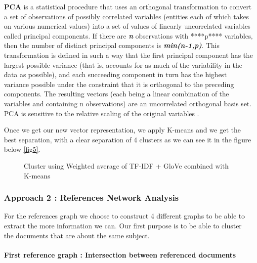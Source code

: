 \documentclass[journal,twocolumn]{IEEEtran}
\begin{document}
\textbf{PCA} is a statistical procedure that uses an orthogonal
transformation to convert a set of observations of possibly correlated
variables (entities each of which takes on various numerical values)
into a set of values of linearly uncorrelated variables called principal
components. If there are \textbf{\emph{n}} observations with ****p****
variables, then the number of distinct principal components is
\textbf{\emph{min(n-1,p)}}. This transformation is defined in such a way
that the first principal component has the largest possible variance
(that is, accounts for as much of the variability in the data as
possible), and each succeeding component in turn has the highest
variance possible under the constraint that it is orthogonal to the
preceding components. The resulting vectors (each being a linear
combination of the variables and containing n observations) are an
uncorrelated orthogonal basis set. PCA is sensitive to the relative
scaling of the original variables \cite{PCA}.

Once we get our new vector representation, we apply K-means and we get
the best separation, with a clear separation of 4 clusters as we can see
it in the figure below \ref{fig5}.


    \begin{figure}
        \begin{center}\end{center}
        \caption{Cluster using Weighted average of TF-IDF + GloVe  combined with K-means }
        \label{fig}
    \end{figure}
    
    \hypertarget{approach-2-references-network-analysis}{%
\subsubsection{Approach 2 : References Network
Analysis}\label{approach-2-references-network-analysis}}

For the references graph we choose to construct 4 different graphs to be
able to extract the more information we can. Our first purpose is to be
able to cluster the documents that are about the same subject.

    \hypertarget{first-reference-graph-intersection-between-referenced-documents}{%
\paragraph{First reference graph : Intersection between referenced
documents}\label{first-reference-graph-intersection-between-referenced-documents}}
\end{document}
